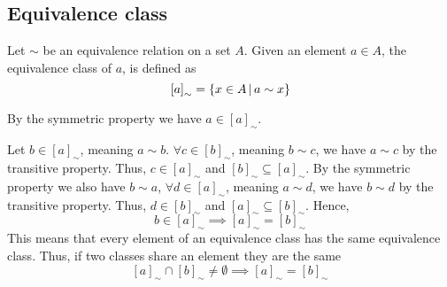 \documentclass{article}
\begin{document}
\subsection{Equivalence class}

Let \(\sim\) be an equivalence relation on a set \(A\).
Given an element \(a\in A\), the equivalence class of \(a\), is defined as
\[
    {[a]}_{\sim} = \{x \in A \,|\, a \sim x\}
\]

By the symmetric property we have \(a \in {[a]}_{\sim}\).

Let \(b \in {[a]}_{\sim}\), meaning \(a \sim b\). \(\forall c \in {[b]}_{\sim}\),
meaning \(b \sim c\), we have \(a \sim c\) by the transitive property.
Thus, \(c \in {[a]}_{\sim}\) and \({[b]}_{\sim} \subseteq {[a]}_{\sim}\).
By the symmetric property we also have \(b \sim a\),
\(\forall d \in {[a]}_{\sim}\), meaning \(a \sim d\), we have
\(b \sim d\) by the transitive property. Thus, \(d \in {[b]}_{\sim}\)
and \({[a]}_{\sim} \subseteq {[b]}_{\sim}\). Hence,
\[
    b \in {[a]}_{\sim} \implies {[a]}_{\sim} = {[b]}_{\sim}
\]
This means that every element of an equivalence class has the same equivalence class.
Thus, if two classes share an element they are the same
\[
    {[a]}_{\sim} \cap {[b]}_{\sim} \neq \emptyset
    \implies {[a]}_{\sim} = {[b]}_{\sim}
\]

\pagebreak
\end{document}
